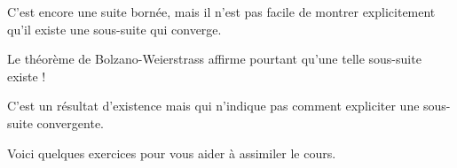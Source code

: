 C'est encore une suite bornée, mais il n'est pas facile de montrer explicitement qu'il existe une sous-suite
qui converge. 

Le théorème de Bolzano-Weierstrass affirme pourtant qu'une telle
sous-suite existe !

C'est un résultat d'existence mais qui n'indique pas comment expliciter une sous-suite convergente.
% 
%  
% 
% 
% 
% 
% 
% 
% 
% 
% 
% 
% 
% 
% 
% 
% 
% 
% 
% 
% 
% 




 \diapo


Voici quelques exercices pour vous aider à assimiler le cours.



